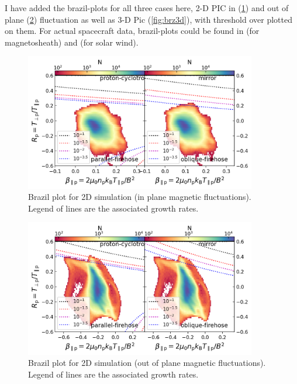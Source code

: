 \documentclass[column]{aastex62}
\begin{document}
    I have added the brazil-plots for all three cases here, 2-D PIC in (\ref{fig:brz2dip}) and out of plane (\ref{fig:brz2dpp}) fluctuation as well as 3-D Pic (\ref{fig:brz3d}), with threshold over plotted on them. For actual spacecraft data, brazil-plots could be found in \citet{Maruca2018} (for magnetosheath) and \citet{Hellinger2006} (for solar wind).

		\begin{figure}
			\begin{center}
				\includegraphics[width=0.9\textwidth]{brzl_thresh_149p6_hb.png}
				\caption{Brazil plot for 2D simulation (in plane magnetic fluctuations). Legend of lines are the associated growth rates.}
				\label{fig:brz2dip}
			\end{center}
		\end{figure}

		\begin{figure}
			\begin{center}
				\includegraphics[width=0.9\textwidth]{brzl_thresh_ti0p6te0p6_Time6000wpe.png}
				\caption{Brazil plot for 2D simulation (out of plane magnetic fluctuations). Legend of lines are the associated growth rates.}
				\label{fig:brz2dpp}
			\end{center}
		\end{figure}
\end{document}
